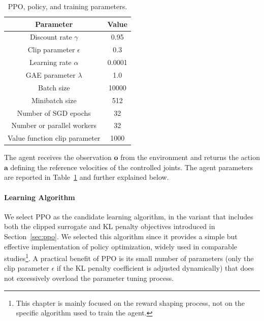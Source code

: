 \begin{table}
    \small
    \center
    \caption{PPO, policy, and training parameters.}
    \label{tab:training_parameters}
    \newcommand{\ck}{\checkmark}
    \begin{tabular}{cc}
        \toprule
        Parameter & \multicolumn{1}{c}{Value} \\
        \midrule \rowcolor{black!10}
        Discount rate $\gamma$ & 0.95 \\
        Clip parameter $\epsilon$ & 0.3 \\ \rowcolor{black!10}
        Learning rate $\alpha$ & 0.0001 \\ 
        GAE parameter $\lambda$ & 1.0 \\ \rowcolor{black!10}
        Batch size & 10000 \\ 
        Minibatch size & 512 \\ \rowcolor{black!10}
        Number of SGD epochs & 32 \\ 
        Number or parallel workers & 32 \\ \rowcolor{black!10}
        Value function clip parameter & 1000 \\ 
        \bottomrule
    \end{tabular}
\end{table}

The agent receives the observation $\boldsymbol{o}$ from the environment and returns the action $\mathbf{a}$ defining the reference velocities of the controlled joints.
The agent parameters are reported in Table~\ref{tab:training_parameters} and further explained below.

\paragraph{Learning Algorithm}

We select \ac{PPO} as the candidate learning algorithm, in the variant that includes both the clipped surrogate and \ac{KL} penalty objectives introduced in Section~\ref{sec:ppo}.
We selected this algorithm since it provides a simple but effective implementation of policy optimization, widely used in comparable studies\footnote{This chapter is mainly focused on the reward shaping process, not on the specific algorithm used to train the agent.}.
A practical benefit of \ac{PPO} is its small number of parameters (only the clip parameter $\epsilon$ if the \ac{KL} penalty coefficient is adjusted dynamically) that does not excessively overload the parameter tuning process.

